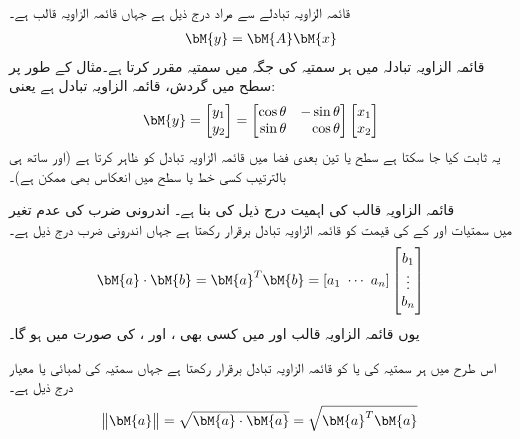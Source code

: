 قائمہ الزاویہ تبادلے سے مراد درج ذیل ہے جہاں  قائمہ الزاویہ قالب ہے۔
\begin{align}
\bM{y}=\bM{A}\bM{x}
\end{align}
 قائمہ الزاویہ تبادلہ  میں ہر سمتیہ  کی جگہ  میں سمتیہ  مقرر کرتا ہے۔مثال کے طور پر سطح میں گردش، قائمہ الزاویہ تبادل ہے یعنی:
\begin{align}\label{مساوات_امتیازی_سطحی_گردش}
\bM{y}=\begin{bmatrix} y_1\\y_2 \end{bmatrix}=\begin{bmatrix*}[r] \cos \theta&-\sin \theta\\ \sin \theta &\cos \theta \end{bmatrix*}\begin{bmatrix}x_1\\x_2  \end{bmatrix}
\end{align}
یہ ثابت کیا جا سکتا ہے سطح یا تین بعدی فضا میں قائمہ الزاویہ تبادل  کو ظاہر کرتا ہے (اور ساتھ ہی بالترتیب کسی خط یا سطح میں انعکاس بھی ممکن ہے)۔

قائمہ الزاویہ قالب کی اہمیت درج ذیل کی بنا ہے۔
\quad اندرونی ضرب کی عدم تغیر\\
 میں سمتیات  اور  کے  کی قیمت کو قائمہ الزاویہ تبادل  برقرار رکھتا ہے جہاں اندرونی ضرب درج ذیل ہے۔
\begin{align}
\bM{a}\cdot \bM{b}=\bM{a}^T\bM{b}=[a_1\,\,\cdots\,\,a_n]\begin{bmatrix}b_1\\  \vdots \\ b_n  \end{bmatrix}
\end{align}
یوں  قائمہ الزاویہ قالب  اور  میں کسی بھی  ،  اور ،  کی صورت میں  ہو گا۔

اس طرح   میں ہر سمتیہ  کی  یا  کو قائمہ الزاویہ تبادل برقرار رکھتا ہے جہاں سمتیہ کی لمبائی یا معیار درج ذیل ہے۔
\begin{align}
\norm{\bM{a}}=\sqrt{\bM{a}\cdot \bM{a}}=\sqrt{\bM{a}^T\bM{a}}
\end{align}  


